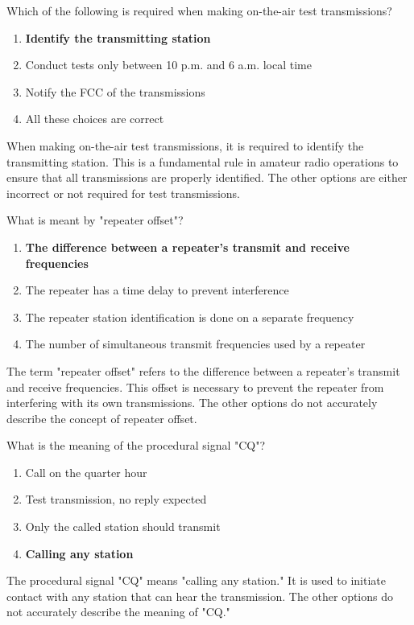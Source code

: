 \begin{tcolorbox}[colback=gray!10!white,colframe=black!75!black,title={T2A06}]
Which of the following is required when making on-the-air test transmissions?
\begin{enumerate}[label=\Alph*),noitemsep]
    \item \textbf{Identify the transmitting station}
    \item Conduct tests only between 10 p.m. and 6 a.m. local time
    \item Notify the FCC of the transmissions
    \item All these choices are correct
\end{enumerate}
\end{tcolorbox}
When making on-the-air test transmissions, it is required to identify the transmitting station. This is a fundamental rule in amateur radio operations to ensure that all transmissions are properly identified. The other options are either incorrect or not required for test transmissions.

\begin{tcolorbox}[colback=gray!10!white,colframe=black!75!black,title={T2A07}]
What is meant by "repeater offset"?
\begin{enumerate}[label=\Alph*),noitemsep]
    \item \textbf{The difference between a repeater’s transmit and receive frequencies}
    \item The repeater has a time delay to prevent interference
    \item The repeater station identification is done on a separate frequency
    \item The number of simultaneous transmit frequencies used by a repeater
\end{enumerate}
\end{tcolorbox}
The term "repeater offset" refers to the difference between a repeater’s transmit and receive frequencies. This offset is necessary to prevent the repeater from interfering with its own transmissions. The other options do not accurately describe the concept of repeater offset.

\begin{tcolorbox}[colback=gray!10!white,colframe=black!75!black,title={T2A08}]
What is the meaning of the procedural signal "CQ"?
\begin{enumerate}[label=\Alph*),noitemsep]
    \item Call on the quarter hour
    \item Test transmission, no reply expected
    \item Only the called station should transmit
    \item \textbf{Calling any station}
\end{enumerate}
\end{tcolorbox}
The procedural signal "CQ" means "calling any station." It is used to initiate contact with any station that can hear the transmission. The other options do not accurately describe the meaning of "CQ."

